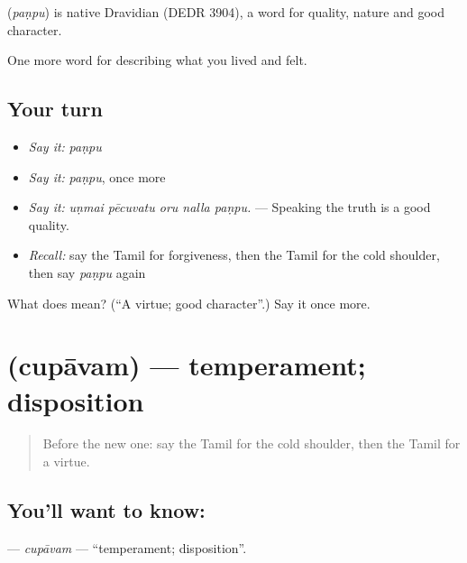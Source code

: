 \begin{cousinweb}
\textbf{} (\emph{paṇpu}) is native Dravidian (DEDR 3904), a word for quality, nature and good character.
\end{cousinweb}

\begin{grammarlens}[title={What you've built}]
One more word for describing what you lived and felt.
\end{grammarlens}

\subsection*{Your turn}
\begin{itemize}
\raggedright
  \item \emph{Say it:} \emph{paṇpu}
  \item \emph{Say it:} \emph{paṇpu}, once more
  \item \emph{Say it:} \emph{uṇmai pēcuvatu oru nalla paṇpu.} — Speaking the truth is a good quality.
  \item \emph{Recall:} say the Tamil for forgiveness, then the Tamil for the cold shoulder, then say \emph{paṇpu} again
\end{itemize}

\begin{tcolorbox}[breakable,colback=teal!4,colframe=teal!35!black,title={Before you move on}]
What does  mean? (\textquotedblleft{}A virtue; good character\textquotedblright{}.) Say it once more.
\end{tcolorbox}
\section[\texorpdfstring{\ta{சுபாவம்} (cupāvam)}{சுபாவம் (cupāvam)}]{ (cupāvam) — temperament; disposition}

\label{lesson:TA-C471-cupavam}



\begin{quote}
Before the new one: say the Tamil for the cold shoulder, then the Tamil for a virtue.
\end{quote}

\subsection*{You'll want to know: }
\textbf{} — \emph{cupāvam} — \textquotedblleft{}temperament; disposition\textquotedblright{}.

